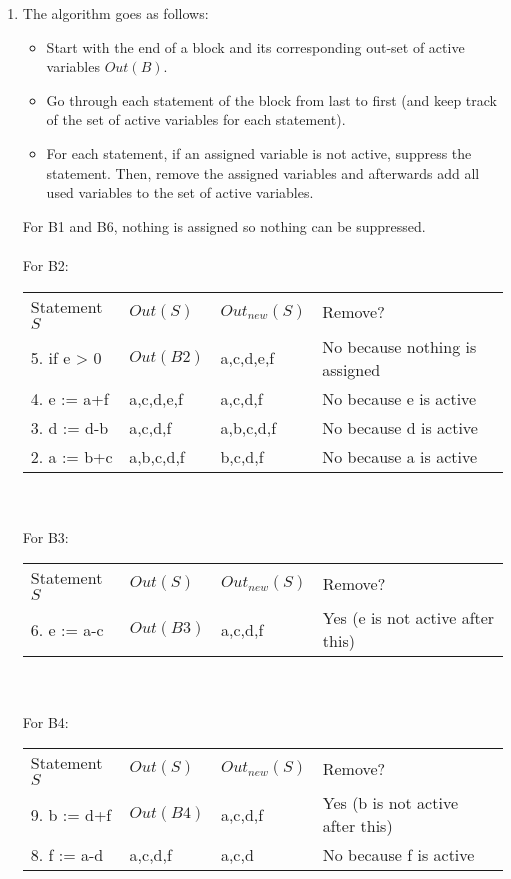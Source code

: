 \documentclass[12pt,fleqn]{article}		%
\begin{document}
\begin{enumerate}
\item The algorithm goes as follows:
\begin{itemize}
\item Start with the end of a block and its corresponding out-set of active variables $Out(B)$.
\item Go through each statement of the block from last to first (and keep track of the set of active variables for each statement).
\item For each statement, if an assigned variable is not active, suppress the statement. Then, remove the assigned variables and afterwards add all used variables to the set of active variables.
\end{itemize}
For B1 and B6, nothing is assigned so nothing can be suppressed.
\\\\
For B2:\\
\begin{tabularx}{\textwidth}{X X X X}
Statement $S$ & $Out(S)$ & $Out_{new}(S)$ & Remove?\\
5. if e > 0 & $Out(B2)$ & a,c,d,e,f & No because nothing is assigned\\
4. e := a+f & a,c,d,e,f & a,c,d,f & No because e is active\\
3. d := d-b & a,c,d,f & a,b,c,d,f & No because d is active\\
2. a := b+c & a,b,c,d,f & b,c,d,f & No because a is active\\
\end{tabularx}
\\\\
For B3:\\
\begin{tabularx}{\textwidth}{X X X X}
Statement $S$ & $Out(S)$ & $Out_{new}(S)$ & Remove?\\
6. e := a-c & $Out(B3)$ & a,c,d,f & Yes (e is not active after this)\\
\end{tabularx}
\\\\
For B4:\\
\begin{tabularx}{\textwidth}{X X X X}
Statement $S$ & $Out(S)$ & $Out_{new}(S)$ & Remove?\\
9. b := d+f & $Out(B4)$ & a,c,d,f & Yes (b is not active after this)\\
8. f := a-d & a,c,d,f & a,c,d & No because f is active\\
\end{tabularx}

\end{enumerate}
\end{document}
